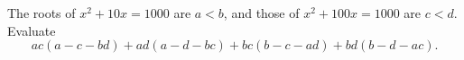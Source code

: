 The roots of $x^2+10x=1000$ are $a<b$, and those of $x^2+100x=1000$ are $c<d$. Evaluate
\[ac(a-c-bd)+ad(a-d-bc)+bc(b-c-ad)+bd(b-d-ac).\]
